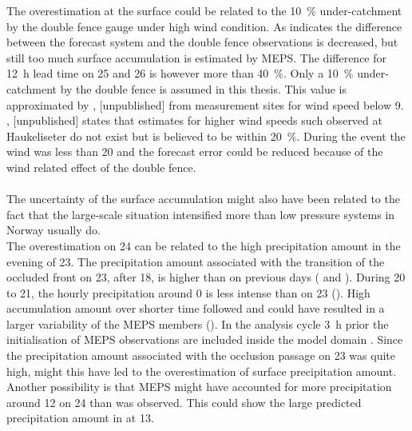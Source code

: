 The overestimation at the surface could be related to the \SI{10}{\percent} under-catchment by the double fence gauge under high wind condition. As  indicates the difference between the forecast system and the double fence observations is decreased, but still too much surface accumulation is estimated by MEPS. The difference for \SI{12}{\hour} lead time on \num{25} and \SI{26}{\dec} is however more than \SI{40}{\percent}. Only a \SI{10}{\percent} under-catchment by the double fence is assumed in this thesis. This value is approximated by \citet{wolff_wmo_2018}, [unpublished] from measurement sites for wind speed below \SI{9}{\mPs}. \citet{wolff_wmo_2018}, [unpublished] states that estimates for higher wind speeds such observed at Haukeliseter do not exist but is believed to be within \SI{20}{\percent}. During the event the wind was less than \SI{20}{\mPs} and the forecast error could be reduced because of the wind related effect of the double fence.
\\
\\
The uncertainty of the surface accumulation might also have been related to the fact that the large-scale situation intensified more than low pressure systems in Norway usually do. 
\\
The overestimation on \SI{24}{\dec} can be related to the high precipitation amount in the evening of \SI{23}{\dec}.
The precipitation amount associated with the transition of the occluded front on \SI{23}{\dec}, after \SI{18}{\UTC}, is higher than on previous days ( and ). During \num{20} to \SI{21}{\dec}, the hourly precipitation around \SI{0}{\UTC} is less intense than on \SI{23}{\dec} (). High accumulation amount over shorter time followed and could have resulted in a larger variability of the MEPS members (). 
In the analysis cycle \SI{3}{\hour} prior the initialisation of MEPS observations are included inside the model domain \citep{homleid_verification_2016}. Since the precipitation amount associated with the occlusion passage on \SI{23}{\dec} was quite high, might this have led to the overestimation of surface precipitation amount. \citep{homleid_verification_2016}
\\
Another possibility is that MEPS might have accounted for more precipitation  around \SI{12}{\UTC} on \SI{24}{\dec} than was observed. This could show the large predicted precipitation amount in  at \SI{13}{\UTC}.
